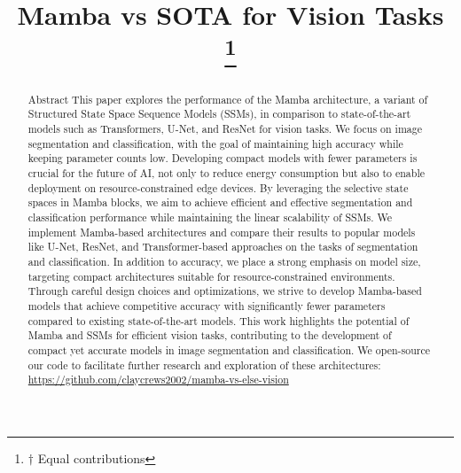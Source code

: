 \documentclass[conference]{IEEEtran}
\begin{document}
\title{Mamba vs SOTA for Vision Tasks\\
    \thanks{$\dagger$ Equal contributions}
}

\author{
    \and
}

\maketitle

\begin{abstract}
    Abstract
    This paper explores the performance of the Mamba architecture, a variant of Structured State Space Sequence Models (SSMs), in comparison to state-of-the-art models such as Transformers, U-Net, and ResNet for vision tasks. We focus on image segmentation and classification, with the goal of maintaining high accuracy while keeping parameter counts low. Developing compact models with fewer parameters is crucial for the future of AI, not only to reduce energy consumption but also to enable deployment on resource-constrained edge devices.
    By leveraging the selective state spaces in Mamba blocks, we aim to achieve efficient and effective segmentation and classification performance while maintaining the linear scalability of SSMs. We implement Mamba-based architectures and compare their results to popular models like U-Net, ResNet, and Transformer-based approaches on the tasks of segmentation and classification.
    In addition to accuracy, we place a strong emphasis on model size, targeting compact architectures suitable for resource-constrained environments. Through careful design choices and optimizations, we strive to develop Mamba-based models that achieve competitive accuracy with significantly fewer parameters compared to existing state-of-the-art models.
    This work highlights the potential of Mamba and SSMs for efficient vision tasks, contributing to the development of compact yet accurate models in image segmentation and classification. We open-source our code to facilitate further research and exploration of these architectures: \href{https://github.com/claycrews2002/mamba-vs-else-vision}{https://github.com/claycrews2002/mamba-vs-else-vision}
\end{abstract}
\end{document}
